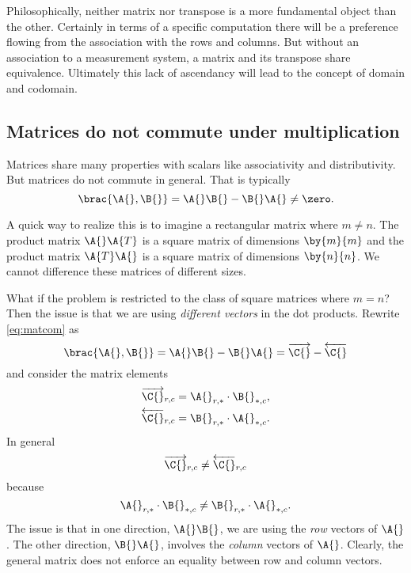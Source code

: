 Philosophically, neither matrix nor transpose is a more fundamental object than the other. Certainly in terms of a specific computation there will be a preference flowing from the association with the rows and columns. But without an association to a measurement system, a matrix and its transpose share equivalence. Ultimately this lack of ascendancy will lead to the concept of domain and codomain.

\subsection[Matrices do not commute]{Matrices do not commute under multiplication}
Matrices share many properties with scalars like associativity and distributivity. But matrices do not commute in general. That is typically
\begin{equation}
  \brac{\A{},\B{}} = \A{}\B{}-\B{}\A{} \ne \zero.
  \label{eq:matcom}
\end{equation}

A quick way to realize this is to imagine a rectangular matrix where $m\ne n$. The product matrix $\A{}\A{T}$ is a square matrix of dimensions $\by{m}{m}$ and the product matrix $\A{T}\A{}$ is a square matrix of dimensions $\by{n}{n}$. We cannot difference these matrices of different sizes.

What if the problem is restricted to the class of square matrices where $m=n$? Then the issue is that we are using \textit{different vectors} in the dot products. Rewrite \eqref{eq:matcom} as 
\begin{equation}
  \brac{\A{},\B{}} = \A{}\B{}-\B{}\A{} = \overrightarrow{\C{}} - \overleftarrow{\C{}}
\end{equation}
and consider the matrix elements 
\begin{equation}
  \begin{split}
    \overrightarrow{\C{}}_{r,c} &= \A{}_{r,*}\cdot\B{}_{*,c},\\
    \overleftarrow{\C{}}_{r,c} &= \B{}_{r,*}\cdot\A{}_{*,c}.\\
  \end{split}
\end{equation}
In general
\begin{equation}
   \overrightarrow{\C{}}_{r,c} \ne \overleftarrow{\C{}}_{r,c}
\end{equation}
because
\begin{equation}
  \A{}_{r,*}\cdot\B{}_{*,c} \ne \B{}_{r,*}\cdot\A{}_{*,c}.
\end{equation}
The issue is that in one direction, $\A{}\B{}$, we are using the \textit{row} vectors of $\A{}$. The other direction, $\B{}\A{}$, involves the \textit{column} vectors of $\A{}$. Clearly, the general matrix does not enforce an equality between row and column vectors.

